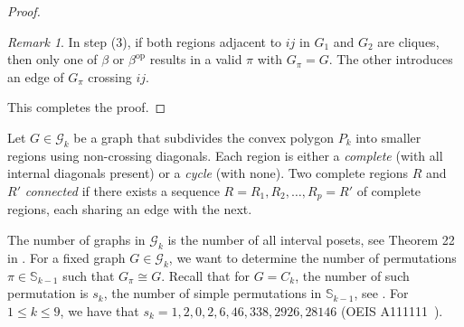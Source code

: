 \documentclass{birkjour}
\theoremstyle{definition}
\theoremstyle{remark}
\newtheorem{rem}[thm]{Remark}
\numberwithin{equation}{section}
\begin{document}
\begin{proof}
\begin{rem}\label{R:kada mozes lijepiti samo jednu}
In step (3), if both regions adjacent to $ij$ in $G_1$ and $G_2$
are cliques, then only one of $\beta$ or $\beta^{\mathrm{op}}$
results in a valid $\pi$ with $G_\pi = G$. The other introduces an
edge of $G_\pi$ crossing $ij$.
\end{rem}
This completes the proof.
\end{proof}


 Let $G\in \mathcal{G}_k$ be a graph that subdivides
 the convex polygon $P_k$
   into smaller regions
   using non-crossing diagonals. Each region is either a
   \emph{complete}
    (with all internal diagonals present) or a \emph{cycle} (with none).
    Two complete regions $R$ and $R'$ \emph{connected} if there
exists a sequence $R=R_1,R_2,\ldots,R_p=R'$ of complete regions,
each sharing an edge with the next.

The number of graphs in $\mathcal{G}_k$ is the number of all
interval posets, see Theorem 22 in \cite{Bouvel}. For a fixed
graph $G \in \mathcal{G}_k$, we want to determine the number of
permutations $\pi \in \mathbb{S}_{k-1}$ such that $G_\pi \cong G$.
Recall that for $G=C_k$, the number of such permutation is $s_k$,
the number of simple permutations in $\mathbb{S}_{k-1}$, see
\cite{Bri}. For $1\leq k\leq 9$, we have that $s_k=1, 2, 0, 2, 6,
46, 338, 2926, 28146$ (OEIS A111111~\cite{Sloan}).
\end{document}
